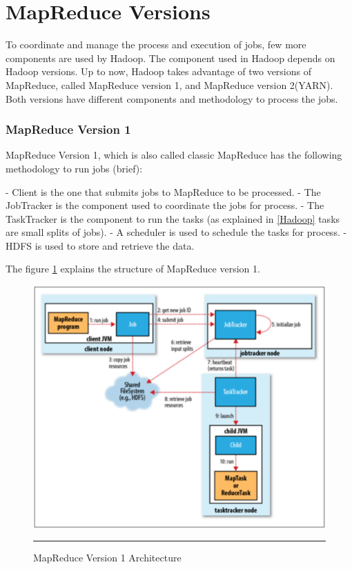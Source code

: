

\section{MapReduce Versions}

To coordinate and manage the process and execution of jobs, few more components are used by Hadoop. The component used in Hadoop depends on Hadoop versions. Up to now, Hadoop takes advantage of two versions of MapReduce, called MapReduce version 1, and MapReduce version 2(YARN). Both versions have different components and methodology to process the jobs. 

\subsubsection{MapReduce Version 1} 
MapReduce Version 1, which is also called classic MapReduce has the following methodology to run jobs (brief):

  - Client is the one that submits jobs to MapReduce to be processed. 
  - The JobTracker is the component used to coordinate the jobs for process. 
  - The TaskTracker is the component to run the tasks (as explained in \ref{Hadoop}
     tasks are small splits of jobs).
  - A scheduler is used to schedule the tasks for process.
  - HDFS‌ is used to store and retrieve the data.  
 
The figure \ref{mrv1}  explains the structure of MapReduce version 1. 

\begin{figure}[htbp]
  \centering
    \includegraphics[width=10 cm,height=10 cm]{./Figures/mrv1.pdf}
    \rule{30em}{0.5pt}
  \caption{MapReduce Version 1 Architecture \cite{tom3}}
  \label{mrv1}
\end{figure}
 


